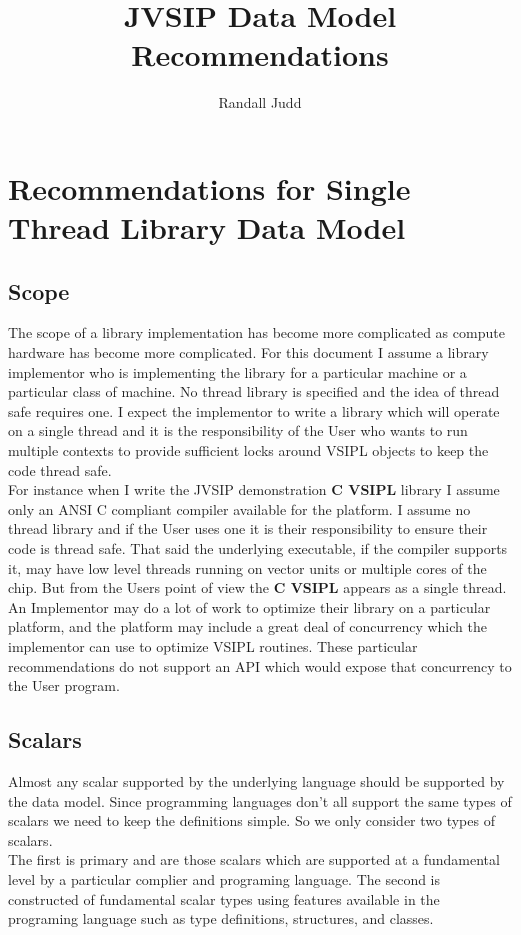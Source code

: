 \documentclass[11pt, oneside]{article}
\title{JVSIP Data Model Recommendations}
\author{Randall Judd}
\newcommand{\cvl}{\ttbf{C VSIPL}}
\newcommand{\ttbf}[1]{{\ttfamily \bfseries #1}}
\begin{document}
\maketitle
\section{Recommendations for Single Thread Library Data Model}
\subsection{Scope}
The scope of a library implementation has become more complicated as compute hardware has become more complicated.  For this document I assume a library implementor who is implementing the library for a particular machine or a particular class of machine.   No thread library is specified and the idea of thread safe requires one.  I expect the implementor to write a library which will operate on a single thread and it is the responsibility of the User who wants to run multiple contexts to provide sufficient locks around VSIPL objects to keep the code thread safe.
\\[6pt]
For instance when I write the JVSIP demonstration \cvl{} library I assume only an ANSI C compliant compiler available for the platform. I assume no thread library and if the User uses one it is their responsibility to ensure their code is thread safe.  That said the underlying executable, if the compiler supports it, may have low level threads running on vector units or multiple cores of the chip.  But from the Users point of view the \cvl{} appears as a single thread.
\\[6pt]
An Implementor may do a lot of work to optimize their library on a particular platform, and the platform may include a great deal of concurrency which the implementor can use to optimize  VSIPL routines. These particular recommendations do not support an API which would expose that concurrency to the User program.
\subsection{Scalars}
Almost any scalar supported by the underlying language should be supported by the data model. Since programming languages don't all support the same types of scalars we need to keep the definitions simple. So we only consider two types of scalars.  
\\[6pt]
The first is primary and are those scalars which are supported at a fundamental level by a particular complier and programing language.  The second is constructed of fundamental scalar types using features available in the programing language such as type definitions, structures, and classes.
\end{document}
